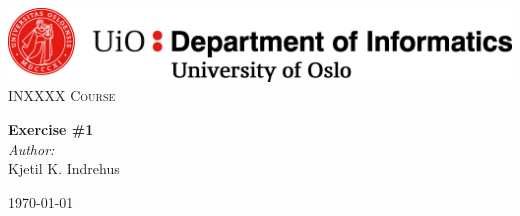 \begin{titlepage}
    \vbox{ }
    \vbox{ }
    \begin{center}
        \includegraphics[width=1\textwidth]{./images/ifi.png}\\[1cm]
        \textsc{\Large INXXXX Course}\\[0.5cm]
        \vbox{ }
        
        { \huge \bfseries Exercise \#1}\\[0.4cm]
        
        \large
        \emph{Author:}\\
            Kjetil K. Indrehus
        \vfill
        
        {\large\today}
    \end{center}
\end{titlepage}